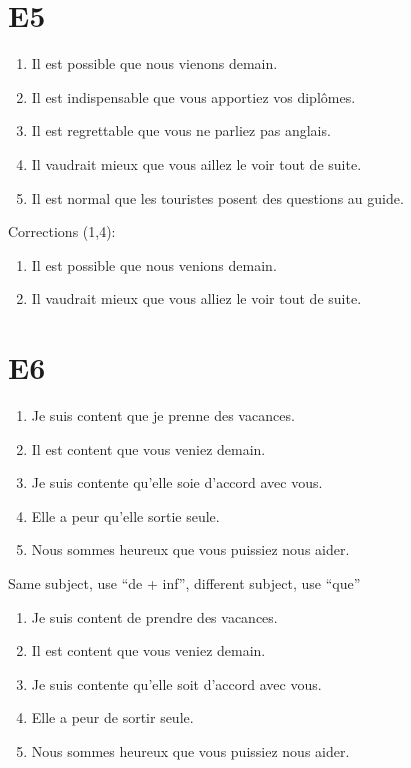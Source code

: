 \documentclass{book}
\begin{document}
    \section{E5}
        \begin{enumerate}
            \item Il est possible que nous vienons demain.
            \item Il est indispensable que vous apportiez vos diplômes.
            \item Il est regrettable que vous ne parliez pas anglais.
            \item Il vaudrait mieux que vous aillez le voir tout de suite.
            \item Il est normal que les touristes posent des questions au guide.
        \end{enumerate}
        Corrections (1,4):
        \begin{enumerate}
            \item Il est possible que nous venions demain.
            \item Il vaudrait mieux que vous alliez le voir tout de suite.
        \end{enumerate}

    \section{E6}
        \begin{enumerate}
            \item Je suis content que je prenne des vacances.
            \item Il est content que vous veniez demain.
            \item Je suis contente qu'elle soie d'accord avec vous.
            \item Elle a peur qu'elle sortie seule.
            \item Nous sommes heureux que vous puissiez nous aider.
        \end{enumerate}
        Same subject, use ``de + inf'', different subject, use ``que''
        \begin{enumerate}
            \item Je suis content de prendre des vacances.
            \item Il est content que vous veniez demain.
            \item Je suis contente qu'elle soit d'accord avec vous.
            \item Elle a peur de sortir seule.
            \item Nous sommes heureux que vous puissiez nous aider.
        \end{enumerate}
\end{document}
